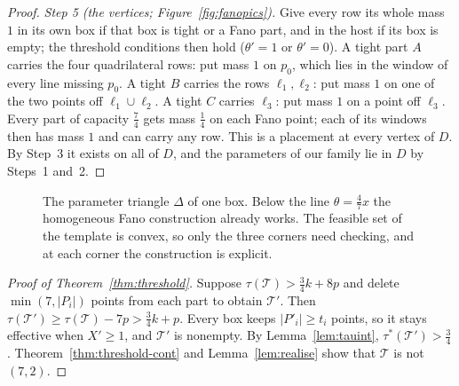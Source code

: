 \documentclass[11pt]{amsart}
\theoremstyle{definition}
\theoremstyle{remark}
\begin{document}
\begin{proof}
\emph{Step 5 (the vertices; Figure~\ref{fig:fanopics}).} Give every row its whole mass $1$ in its own box if that box is tight or a Fano part, and in the host if its box is empty; the threshold conditions then hold ($\theta'=1$ or $\theta'=0$). A tight part $A$ carries the four quadrilateral rows: put mass $1$ on $p_0$, which lies in the window of every line missing $p_0$. A tight $B$ carries the rows $\ell_1,\ell_2$: put mass $1$ on one of the two points off $\ell_1\cup\ell_2$. A tight $C$ carries $\ell_3$: put mass $1$ on a point off $\ell_3$. Every part of capacity $\frac74$ gets mass $\frac14$ on each Fano point; each of its windows then has mass $1$ and can carry any row. This is a placement at every vertex of $D$. By Step~3 it exists on all of $D$, and the parameters of our family lie in $D$ by Steps~1 and~2.
\end{proof}


\begin{figure}[t]
\centering
{}
\caption{The parameter triangle $\Delta$ of one box. Below the line $\theta=\frac47x$ the homogeneous Fano construction already works. The feasible set of the template is convex, so only the three corners need checking, and at each corner the construction is explicit.}\label{fig:triangle}
\end{figure}

\begin{proof}[Proof of Theorem~\ref{thm:threshold}]
Suppose $\tau(\mathcal T)>\frac34k+8p$ and delete $\min(7,|P_i|)$ points from each part to obtain $\mathcal T'$. Then $\tau(\mathcal T')\ge\tau(\mathcal T)-7p>\frac34k+p$. Every box keeps $|P'_i|\ge t_i$ points, so it stays effective when $X'\ge1$, and $\mathcal T'$ is nonempty. By Lemma~\ref{lem:tauint}, $\tau^*(\mathcal T')>\frac34$. Theorem~\ref{thm:threshold-cont} and Lemma~\ref{lem:realise} show that $\mathcal T$ is not $(7,2)$.
\end{proof}
\end{document}
